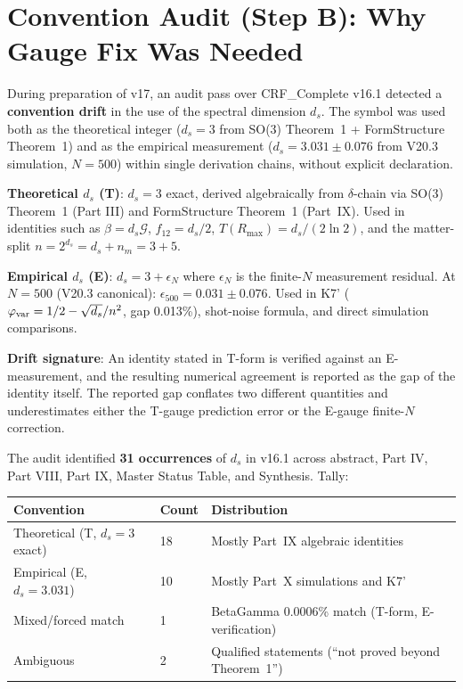 \documentclass[12pt, a4paper]{article}
\begin{document}
\section{Convention Audit (Step B): Why Gauge Fix Was Needed}


During preparation of v17, an audit pass over CRF\_Complete v16.1 detected a
\textbf{convention drift} in the use of the spectral dimension $d_s$. The
symbol was used both as the theoretical integer ($d_s = 3$ from SO(3)
Theorem~1 + FormStructure Theorem~1) and as the empirical measurement
($d_s = 3.031 \pm 0.076$ from V20.3 simulation, $N=500$) within single
derivation chains, without explicit declaration.

\begin{formalbox}[title={The Two Uses of $d_s$ in v16.1}]
\textbf{Theoretical $d_s$ (T)}: $d_s = 3$ exact, derived algebraically from
$\delta$-chain via SO(3) Theorem~1 (Part III) and FormStructure Theorem~1
(Part~IX). Used in identities such as $\beta = d_s\mathcal{G}$, $f_{12} = d_s/2$,
$T(R_{\max}) = d_s/(2\ln 2)$, and the matter-split $n = 2^{d_s} = d_s + n_m = 3 + 5$.

\textbf{Empirical $d_s$ (E)}: $d_s = 3 + \epsilon_N$ where $\epsilon_N$ is the
finite-$N$ measurement residual. At $N=500$ (V20.3 canonical): $\epsilon_{500}
= 0.031 \pm 0.076$. Used in K7' ($\varphi_{\rm var} = 1/2 - \sqrt{d_s}/n^2$,
gap 0.013\%), shot-noise formula, and direct simulation comparisons.

\textbf{Drift signature}: An identity stated in T-form is verified against an
E-measurement, and the resulting numerical agreement is reported as the gap
of the identity itself. The reported gap conflates two different quantities
and underestimates either the T-gauge prediction error or the E-gauge
finite-$N$ correction.
\end{formalbox}

The audit identified \textbf{31 occurrences} of $d_s$ in v16.1 across abstract,
Part IV, Part VIII, Part IX, Master Status Table, and Synthesis. Tally:

\begin{center}
{\small
\renewcommand{\arraystretch}{1.30}
\begin{tabular}{p{4cm} p{2cm} p{6cm}}
\toprule
\textbf{Convention} & \textbf{Count} & \textbf{Distribution} \\
\midrule
Theoretical (T, $d_s=3$ exact) & 18 & Mostly Part~IX algebraic identities \\
Empirical (E, $d_s=3.031$)     & 10 & Mostly Part~X simulations and K7' \\
Mixed/forced match             & 1  & BetaGamma 0.0006\% match (T-form, E-verification) \\
Ambiguous                      & 2  & Qualified statements (``not proved beyond Theorem~1'') \\
\bottomrule
\end{tabular}
}
\end{center}
\end{document}
